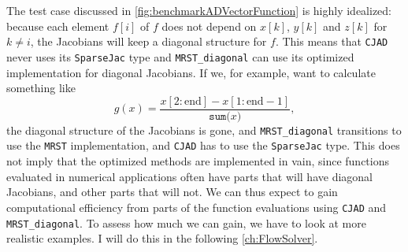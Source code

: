 The test case discussed in \autoref{fig:benchmarkADVectorFunction} is highly idealized: because each element $f[i]$ of $f$ does not depend on $x[k]$, $y[k]$ and $z[k]$ for $k\not=i$, the Jacobians will keep a diagonal structure for $f$. This means that \texttt{CJAD} never uses its \texttt{SparseJac} type and \texttt{MRST\_diagonal} can use its optimized implementation for diagonal Jacobians. If we, for example, want to calculate something like
\begin{equation*}
g(x) = \frac{x\left[2:\text{end}\right] - x\left[1:\text{end}-1\right]}{\texttt{sum(}x\texttt{)}},
\end{equation*}
the diagonal structure of the Jacobians is gone, and \texttt{MRST\_diagonal} transitions to use the \texttt{MRST} implementation, and \texttt{CJAD} has to use the \texttt{SparseJac} type. This does not imply that the optimized methods are implemented in vain, since functions evaluated in numerical applications often have parts that will have diagonal Jacobians, and other parts that will not. We can thus expect to gain computational efficiency from parts of the function evaluations using \texttt{CJAD} and \texttt{MRST\_diagonal}. To assess how much we can gain, we have to look at more realistic examples. I will do this in the following \autoref{ch:FlowSolver}. 

